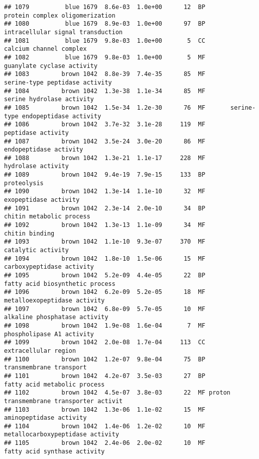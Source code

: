 \documentclass[]{article}
\begin{document}
\begin{verbatim}
## 1079          blue 1679  8.6e-03  1.0e+00      12  BP          protein complex oligomerization
## 1080          blue 1679  8.9e-03  1.0e+00      97  BP        intracellular signal transduction
## 1081          blue 1679  9.8e-03  1.0e+00       5  CC                  calcium channel complex
## 1082          blue 1679  9.8e-03  1.0e+00       5  MF               guanylate cyclase activity
## 1083         brown 1042  8.8e-39  7.4e-35      85  MF           serine-type peptidase activity
## 1084         brown 1042  1.3e-38  1.1e-34      85  MF                serine hydrolase activity
## 1085         brown 1042  1.5e-34  1.2e-30      76  MF       serine-type endopeptidase activity
## 1086         brown 1042  3.7e-32  3.1e-28     119  MF                       peptidase activity
## 1087         brown 1042  3.5e-24  3.0e-20      86  MF                   endopeptidase activity
## 1088         brown 1042  1.3e-21  1.1e-17     228  MF                       hydrolase activity
## 1089         brown 1042  9.4e-19  7.9e-15     133  BP                              proteolysis
## 1090         brown 1042  1.3e-14  1.1e-10      32  MF                    exopeptidase activity
## 1091         brown 1042  2.3e-14  2.0e-10      34  BP                 chitin metabolic process
## 1092         brown 1042  1.3e-13  1.1e-09      34  MF                           chitin binding
## 1093         brown 1042  1.1e-10  9.3e-07     370  MF                       catalytic activity
## 1094         brown 1042  1.8e-10  1.5e-06      15  MF                carboxypeptidase activity
## 1095         brown 1042  5.2e-09  4.4e-05      22  BP          fatty acid biosynthetic process
## 1096         brown 1042  6.2e-09  5.2e-05      18  MF             metalloexopeptidase activity
## 1097         brown 1042  6.8e-09  5.7e-05      10  MF            alkaline phosphatase activity
## 1098         brown 1042  1.9e-08  1.6e-04       7  MF                phospholipase A1 activity
## 1099         brown 1042  2.0e-08  1.7e-04     113  CC                     extracellular region
## 1100         brown 1042  1.2e-07  9.8e-04      75  BP                  transmembrane transport
## 1101         brown 1042  4.2e-07  3.5e-03      27  BP             fatty acid metabolic process
## 1102         brown 1042  4.5e-07  3.8e-03      22  MF proton transmembrane transporter activit
## 1103         brown 1042  1.3e-06  1.1e-02      15  MF                  aminopeptidase activity
## 1104         brown 1042  1.4e-06  1.2e-02      10  MF         metallocarboxypeptidase activity
## 1105         brown 1042  2.4e-06  2.0e-02      10  MF             fatty acid synthase activity

\end{verbatim}
\end{document}
